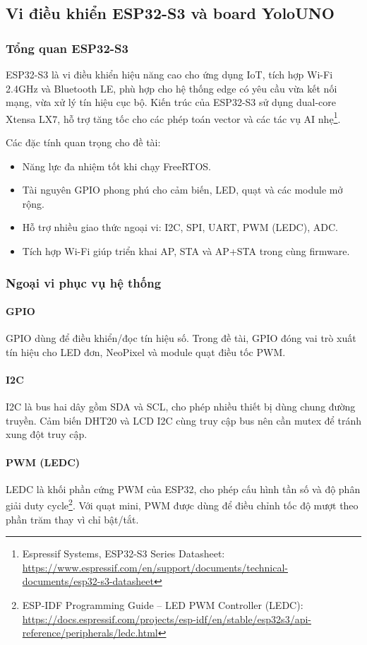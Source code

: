 \subsection{Vi điều khiển ESP32-S3 và board YoloUNO}

\subsubsection*{Tổng quan ESP32-S3}

ESP32-S3 là vi điều khiển hiệu năng cao cho ứng dụng IoT, tích hợp Wi-Fi 2.4GHz và Bluetooth LE, phù hợp cho hệ thống edge có yêu cầu vừa kết nối mạng, vừa xử lý tín hiệu cục bộ. Kiến trúc của ESP32-S3 sử dụng dual-core Xtensa LX7, hỗ trợ tăng tốc cho các phép toán vector và các tác vụ AI nhẹ\footnote{Espressif Systems, ESP32-S3 Series Datasheet: \url{https://www.espressif.com/en/support/documents/technical-documents/esp32-s3-datasheet}}.

Các đặc tính quan trọng cho đề tài:
\begin{itemize}
    \item Năng lực đa nhiệm tốt khi chạy FreeRTOS.
    \item Tài nguyên GPIO phong phú cho cảm biến, LED, quạt và các module mở rộng.
    \item Hỗ trợ nhiều giao thức ngoại vi: I2C, SPI, UART, PWM (LEDC), ADC.
    \item Tích hợp Wi-Fi giúp triển khai AP, STA và AP+STA trong cùng firmware.
\end{itemize}

\subsubsection*{Ngoại vi phục vụ hệ thống}

\paragraph{GPIO}
GPIO dùng để điều khiển/đọc tín hiệu số. Trong đề tài, GPIO đóng vai trò xuất tín hiệu cho LED đơn, NeoPixel và module quạt điều tốc PWM.

\paragraph{I2C}
I2C là bus hai dây gồm SDA và SCL, cho phép nhiều thiết bị dùng chung đường truyền. Cảm biến DHT20 và LCD I2C cùng truy cập bus nên cần mutex để tránh xung đột truy cập.

\paragraph{PWM (LEDC)}
LEDC là khối phần cứng PWM của ESP32, cho phép cấu hình tần số và độ phân giải duty cycle\footnote{ESP-IDF Programming Guide -- LED PWM Controller (LEDC): \url{https://docs.espressif.com/projects/esp-idf/en/stable/esp32s3/api-reference/peripherals/ledc.html}}. Với quạt mini, PWM được dùng để điều chỉnh tốc độ mượt theo phần trăm thay vì chỉ bật/tắt.

